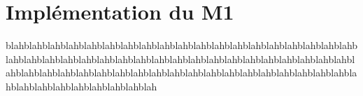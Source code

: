 \chapter{Implémentation du M1}

blahblahblahblahblahblahblahblahblahblahblahblahblahblahblahblahblahblahblahblahblahblahblahblahblahblahblahblahblahblahblahblahblahblahblahblahblahblahblahblahblahblahblahblahblahblahblahblahblahblahblahblahblahblahblahblahblahblahblahblahblahblahblahblahblahblah
